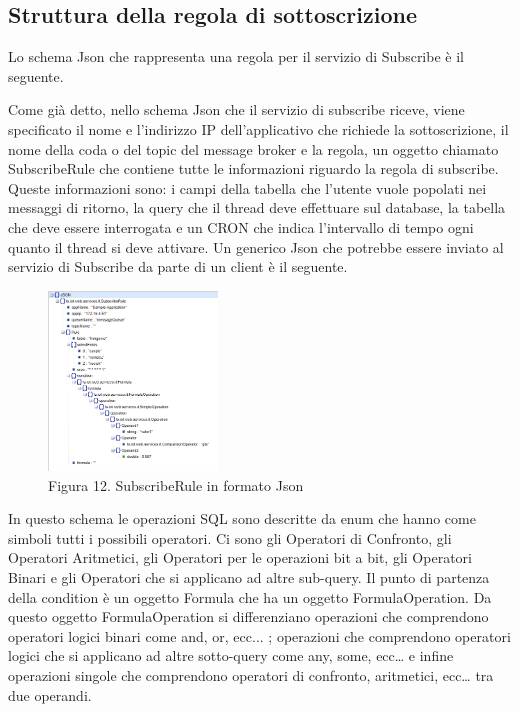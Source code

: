 \subsection{Struttura della regola di sottoscrizione}
Lo schema Json che rappresenta una regola per il servizio di Subscribe è il seguente. 
{\selectfont
	
}
Come già detto, nello schema Json che il servizio di subscribe riceve, viene specificato il nome e l’indirizzo IP dell’applicativo che richiede la sottoscrizione, il nome della coda o del topic del message broker e la regola, un oggetto chiamato SubscribeRule che contiene tutte le informazioni riguardo la regola di subscribe. Queste informazioni sono: i campi della tabella che l’utente vuole popolati nei messaggi di ritorno, la query che il thread deve effettuare sul database, la tabella che deve essere interrogata e un CRON che indica l’intervallo di tempo ogni quanto il thread si deve attivare.
\clearpage
Un generico Json che potrebbe essere inviato al servizio di Subscribe da parte di un client è il seguente.
\begin{figure}[h]
	\centering
	\includegraphics[width=0.4\textwidth]{subscribe-json-1.png}
	\caption*{Figura 12. SubscribeRule in formato Json}
\end{figure}
\par
In questo schema le operazioni SQL sono descritte da enum che hanno come simboli tutti i possibili operatori. Ci sono gli Operatori di Confronto, gli Operatori Aritmetici, gli Operatori per le operazioni bit a bit, gli Operatori Binari e gli Operatori che si applicano ad altre sub-query. Il punto di partenza della condition è un oggetto Formula che ha un oggetto FormulaOperation. Da questo oggetto FormulaOperation si differenziano operazioni che comprendono operatori logici binari come and, or, ecc... ; operazioni che comprendono operatori logici che si applicano ad altre sotto-query come any, some, ecc… e infine operazioni singole che comprendono operatori di confronto, aritmetici, ecc… tra due operandi.
